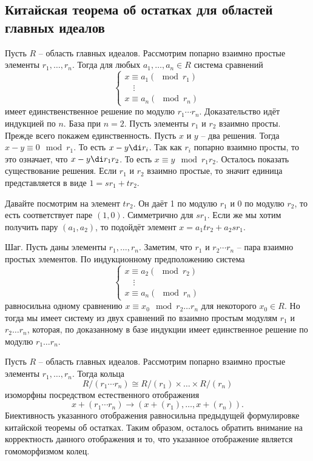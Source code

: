 \subsection{Китайская теорема об остатках для областей главных идеалов}

 Пусть $R$ -- область главных идеалов. Рассмотрим попарно взаимно простые элементы $r_1,\dots,r_n$. Тогда для любых $a_1,\dots,a_n\in R$ система сравнений
$$ \begin{cases}
x\equiv a_1 (\mod r_1)\\
\quad \vdots \\
x\equiv a_n (\mod r_n)
\end{cases}$$
имеет единственственное решение по модулю $r_1\cdots r_n$.
\ethrm
\proof Доказательство идёт индукцией по $n$. База при $n=2$. Пусть элементы $r_1$ и $r_2$ взаимно просты. Прежде всего покажем единственность. Пусть $x$ и $y$ -- два решения. Тогда $x-y \equiv 0 \mod r_1$. То есть $x-y \di r_i$. Так как $r_i$ попарно взаимно просты, то это означает, что $x-y \di r_1 r_2 $. То есть $x\equiv y \mod r_1 r_2$.
Осталось показать существование решения. Если $r_1$ и $r_2$ взаимно простые, то значит единица представляется в виде $1=sr_1+tr_2$.

Давайте посмотрим на элемент $tr_2$. Он даёт 1 по модулю $r_1$ и 0 по модулю $r_2$, то есть соответствует паре $(1,0)$. Симметрично для  $sr_1$. Если же мы хотим получить пару $(a_1,a_2)$, то подойдёт элемент $x=a_1tr_2+a_2sr_1$.

Шаг. Пусть даны элементы $r_1,\dots, r_n$. Заметим, что $r_1$ и $r_2\cdots r_n$ -- пара взаимно простых элементов. По индукционному предположению система 
$$ \begin{cases}
x\equiv a_2 (\mod r_2)\\
\quad \vdots \\
x\equiv a_n (\mod r_n)
\end{cases}$$
равносильна одному сравнению $x\equiv x_0 \mod r_2\dots r_n$ для некоторого $x_0\in R$. Но тогда мы имеет систему из двух сравнений по взаимно простым модулям $r_1$ и $r_2\dots r_n$, которая, по доказанному в базе индукции имеет единственное решение по модулю $r_1\dots r_n$.
\endproof


 Пусть $R$ -- область главных идеалов. Рассмотрим попарно взаимно простые элементы $r_1,\dots,r_n$. Тогда кольца
$$R/(r_1 \cdots r_n) \cong R/(r_1) \times\dots \times R/(r_n)$$
изоморфны посредством естественного отображения
$$ x +(r_1\cdots r_n) \to \left(x+(r_1),\dots,x+(r_n)\right).$$
\ecrl 
\proof Биективность указанного отображения равносильна предыдущей формулировке китайской теоремы об остатках. Таким образом, осталось обратить внимание на корректность данного отображения и то, что указанное отображение является гомоморфизмом колец. 
\endproof


